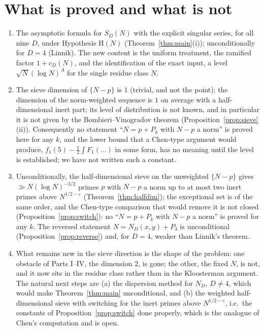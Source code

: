 \documentclass[11pt]{amsart}
\theoremstyle{definition}
\theoremstyle{remark}
\newcommand{\e}{\varepsilon}
\begin{document}
\section{What is proved and what is not}\label{sec:status}
\begin{enumerate}[label=\textup{(\arabic*)},leftmargin=2.2em]
\item The asymptotic formula for $S_D(N)$ with the explicit singular series, for all nine $D$, under Hypothesis $\mathrm H(N)$ (Theorem~\ref{thm:main}(i)); unconditionally for $D=4$ (Linnik). The new content is the uniform treatment, the ramified factor $1+c_D(N)$, and the identification of the exact input, a level $\sqrt N(\log N)^A$ for the single residue class $N$.
\item The sieve dimension of $\{N-p\}$ is $1$ (trivial, and not the point); the dimension of the norm-weighted sequence is $1$ on average with a half-dimensional inert part; its level of distribution is not known, and in particular it is not given by the Bombieri--Vinogradov theorem (Proposition~\ref{prop:sieve}(ii)). Consequently no statement ``$N=p+P_k$ with $N-p$ a norm'' is proved here for any $k$, and the lower bound that a Chen-type argument would produce, $f_1(5)-\frac12\int F_1(\dots)$ in some form, has no meaning until the level is established; we have not written such a constant.
\item Unconditionally, the half-dimensional sieve on the unweighted $\{N-p\}$ gives $\gg N(\log N)^{-3/2}$ primes $p$ with $N-p$ a norm up to at most two inert primes above $N^{1/2-\e}$ (Theorem~\ref{thm:halfdim}); the exceptional set is of the same order, and the Chen-type comparison that would remove it is not closed (Proposition~\ref{prop:switch}): no ``$N=p+P_k$ with $N-p$ a norm'' is proved for any $k$. The reversed statement $N=N_D(x,y)+P_3$ is unconditional (Proposition~\ref{prop:reverse}) and, for $D=4$, weaker than Linnik's theorem.
\item What remains new in the sieve direction is the shape of the problem: one obstacle of Parts I--IV, the dimension $2$, is gone; the other, the fixed $N$, is not, and it now sits in the residue class rather than in the Kloosterman argument. The natural next steps are (a) the dispersion method for $N_D$, $D\ne4$, which would make Theorem~\ref{thm:main} unconditional, and (b) the weighted half-dimensional sieve with switching for the inert primes above $N^{1/2-\e}$, i.e.\ the constants of Proposition~\ref{prop:switch} done properly, which is the analogue of Chen's computation and is open.
\end{enumerate}
\end{document}
